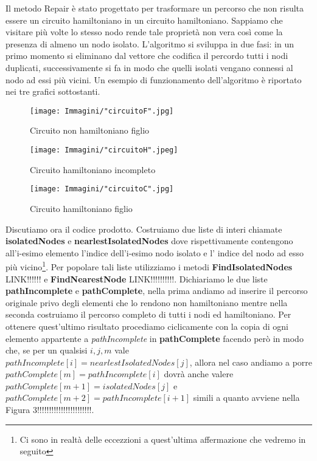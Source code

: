 \documentclass[11pt]{article}
\begin{document}
Il metodo Repair è stato progettato per trasformare un percorso che non risulta essere un circuito hamiltoniano in un circuito hamiltoniano. Sappiamo che visitare più volte lo stesso nodo rende tale proprietà non vera così come la presenza di almeno un nodo isolato. L'algoritmo si sviluppa in due fasi: in un primo momento si eliminano dal vettore che codifica il percordo tutti i nodi duplicati, successivamente si fa in modo che quelli isolati vengano connessi al nodo ad essi più vicini. Un esempio di funzionamento dell'algoritmo è riportato nei tre grafici sottostanti.

\begin{figure}[htbp]
    \centering
    \texttt{[image: Immagini/"circuitoF".jpg]}
    \caption{Circuito non hamiltoniano figlio}
\end{figure}

\begin{figure}[htbp]
    \centering
    \texttt{[image: Immagini/"circuitoH".jpeg]}
    \caption{Circuito hamiltoniano incompleto}
\end{figure}

\begin{figure}[htbp]
    \centering
    \texttt{[image: Immagini/"circuitoC".jpg]}
    \caption{Circuito hamiltoniano figlio}
\end{figure}

Discutiamo ora il codice prodotto. Costruiamo due liste di interi chiamate \textbf{isolatedNodes} e \textbf{nearlestIsolatedNodes} dove rispettivamente contengono all'i-esimo elemento l'indice dell'i-esimo nodo isolato e l' indice del nodo ad esso più vicino\footnote{Ci sono in realtà delle eccezzioni a quest'ultima affermazione che vedremo in seguito}.
Per popolare tali liste utilizziamo i metodi \textbf{FindIsolatedNodes} LINK!!!!!! e \textbf{FindNearestNode} LINK!!!!!!!!!!.
Dichiariamo le due liste \textbf{pathIncomplete} e \textbf{pathComplete}, nella prima andiamo ad inserire il percorso originale privo degli elementi che lo rendono non hamiltoniano mentre nella seconda costruiamo il percorso completo di tutti i nodi ed hamiltoniano. Per ottenere quest'ultimo risultato procediamo ciclicamente con la copia di ogni elemento appartente a \textit{pathIncomplete} in \textbf{pathComplete} facendo però in modo che, se per un qualsisi $i, j, m$ vale $pathIncomplete[i]=nearlestIsolatedNodes[j]$, allora nel caso andiamo a porre $pathComplete[m]=pathIncomplete[i]$ dovrà anche valere $pathComplete[m+1]=isolatedNodes[j]$ e $pathComplete[m+2]=pathIncomplete[i+1]$ simili a quanto avviene nella Figura 3!!!!!!!!!!!!!!!!!!!!!!!.
\end{document}
